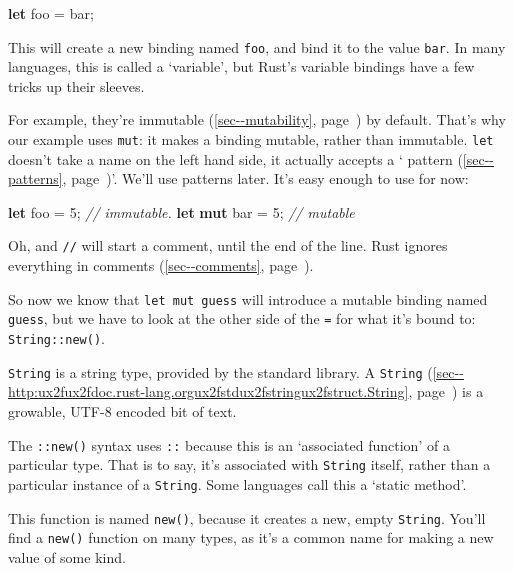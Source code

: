 \documentclass[a4paper,]{book}
\renewcommand*{\hyperref}[2][\ar]{%
  \def\ar{#2}%
  #2 (\autoref{#1}, page~\pageref{#1})}
\newenvironment{Shaded}{\begin{snugshade}}{\end{snugshade}}
\newcommand{\KeywordTok}[1]{\textcolor[rgb]{0.13,0.29,0.53}{\textbf{{#1}}}}
\newcommand{\DecValTok}[1]{\textcolor[rgb]{0.00,0.00,0.81}{{#1}}}
\newcommand{\CommentTok}[1]{\textcolor[rgb]{0.56,0.35,0.01}{\textit{{#1}}}}
\newcommand{\NormalTok}[1]{{#1}}
\begin{document}
\begin{Shaded}
\begin{Highlighting}[]
\KeywordTok{let} \NormalTok{foo = bar;}
\end{Highlighting}
\end{Shaded}

This will create a new binding named \texttt{foo}, and bind it to the
value \texttt{bar}. In many languages, this is called a `variable', but
Rust's variable bindings have a few tricks up their sleeves.

For example, they're \hyperref[sec--mutability]{immutable} by default.
That's why our example uses \texttt{mut}: it makes a binding mutable,
rather than immutable. \texttt{let} doesn't take a name on the left hand
side, it actually accepts a `\hyperref[sec--patterns]{pattern}'. We'll
use patterns later. It's easy enough to use for now:

\begin{Shaded}
\begin{Highlighting}[]
\KeywordTok{let} \NormalTok{foo = }\DecValTok{5}\NormalTok{; }\CommentTok{// immutable.}
\KeywordTok{let} \KeywordTok{mut} \NormalTok{bar = }\DecValTok{5}\NormalTok{; }\CommentTok{// mutable}
\end{Highlighting}
\end{Shaded}

Oh, and \texttt{//} will start a comment, until the end of the line.
Rust ignores everything in \hyperref[sec--comments]{comments}.

So now we know that \texttt{let\ mut\ guess} will introduce a mutable
binding named \texttt{guess}, but we have to look at the other side of
the \texttt{=} for what it's bound to: \texttt{String::new()}.

\texttt{String} is a string type, provided by the standard library. A
\hyperref[sec--http:ux2fux2fdoc.rust-lang.orgux2fstdux2fstringux2fstruct.String]{\texttt{String}}
is a growable, UTF-8 encoded bit of text.

The \texttt{::new()} syntax uses \texttt{::} because this is an
`associated function' of a particular type. That is to say, it's
associated with \texttt{String} itself, rather than a particular
instance of a \texttt{String}. Some languages call this a `static
method'.

This function is named \texttt{new()}, because it creates a new, empty
\texttt{String}. You'll find a \texttt{new()} function on many types, as
it's a common name for making a new value of some kind.
\end{document}

